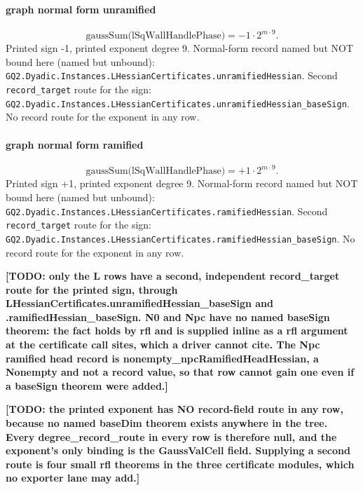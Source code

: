 \paragraph{graph normal form unramified}
\[\mathrm{gaussSum}\bigl(\mathrm{lSqWallHandlePhase}\bigr)=-1\cdot 2^{m\cdot 9}.\]
Printed sign -1, printed exponent degree 9. Normal-form record named but NOT bound here (named but unbound): \texttt{GQ2.Dyadic.Instances.LHessianCertificates.unramifiedHessian}.
Second \texttt{record\_target} route for the sign: \texttt{GQ2.Dyadic.Instances.LHessianCertificates.unramifiedHessian\_baseSign}. No record route for the exponent in any row.
\paragraph{graph normal form ramified}
\[\mathrm{gaussSum}\bigl(\mathrm{lSqWallHandlePhase}\bigr)=+1\cdot 2^{m\cdot 9}.\]
Printed sign +1, printed exponent degree 9. Normal-form record named but NOT bound here (named but unbound): \texttt{GQ2.Dyadic.Instances.LHessianCertificates.ramifiedHessian}.
Second \texttt{record\_target} route for the sign: \texttt{GQ2.Dyadic.Instances.LHessianCertificates.ramifiedHessian\_baseSign}. No record route for the exponent in any row.
\par\noindent\textbf{[TODO: only the L rows have a second, independent record\_target route for the printed sign, through LHessianCertificates.unramifiedHessian\_baseSign and .ramifiedHessian\_baseSign. N0 and Npc have no named baseSign theorem: the fact holds by rfl and is supplied inline as a rfl argument at the certificate call sites, which a driver cannot cite. The Npc ramified head record is nonempty\_npcRamifiedHeadHessian, a Nonempty and not a record value, so that row cannot gain one even if a baseSign theorem were added.]}
\par\noindent\textbf{[TODO: the printed exponent has NO record-field route in any row, because no named baseDim theorem exists anywhere in the tree. Every degree\_record\_route in every row is therefore null, and the exponent's only binding is the GaussValCell field. Supplying a second route is four small rfl theorems in the three certificate modules, which no exporter lane may add.]}
